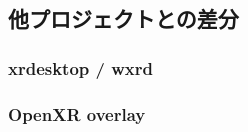 \subsection{他プロジェクトとの差分}

\subsubsection{xrdesktop / wxrd}

\subsubsection{OpenXR overlay}
\label{section:openxr-overlay}
